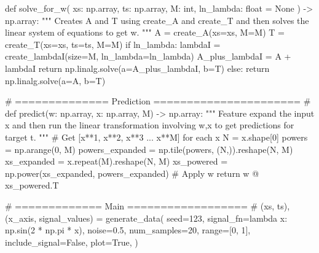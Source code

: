 \documentclass[
  0.875em,
  letterpaper,
  DIV=11,
  numbers=noendperiod]{scrartcl}
\newenvironment{Shaded}{\begin{snugshade}}{\end{snugshade}}
\newcommand{\BuiltInTok}[1]{\textcolor[rgb]{0.00,0.23,0.31}{#1}}
\newcommand{\CommentTok}[1]{\textcolor[rgb]{0.37,0.37,0.37}{#1}}
\newcommand{\ControlFlowTok}[1]{\textcolor[rgb]{0.00,0.23,0.31}{#1}}
\newcommand{\DecValTok}[1]{\textcolor[rgb]{0.68,0.00,0.00}{#1}}
\newcommand{\FloatTok}[1]{\textcolor[rgb]{0.68,0.00,0.00}{#1}}
\newcommand{\KeywordTok}[1]{\textcolor[rgb]{0.00,0.23,0.31}{#1}}
\newcommand{\NormalTok}[1]{\textcolor[rgb]{0.00,0.23,0.31}{#1}}
\newcommand{\OperatorTok}[1]{\textcolor[rgb]{0.37,0.37,0.37}{#1}}
\newcommand{\VariableTok}[1]{\textcolor[rgb]{0.07,0.07,0.07}{#1}}
\begin{document}
\begin{Shaded}
\begin{Highlighting}[]
\KeywordTok{def}\NormalTok{ solve\_for\_w(}
\NormalTok{    xs: np.array, ts: np.array, M: }\BuiltInTok{int}\NormalTok{, ln\_lambda: }\BuiltInTok{float} \OperatorTok{=} \VariableTok{None}
\NormalTok{) }\OperatorTok{{-}\textgreater{}}\NormalTok{ np.array:}
    \CommentTok{"""}
\CommentTok{    Creates A and T using \textasciigrave{}create\_A\textasciigrave{} and \textasciigrave{}create\_T\textasciigrave{} and then solves}
\CommentTok{    the linear system of equations to get w.}
\CommentTok{    """}
\NormalTok{    A }\OperatorTok{=}\NormalTok{ create\_A(xs}\OperatorTok{=}\NormalTok{xs, M}\OperatorTok{=}\NormalTok{M)}
\NormalTok{    T }\OperatorTok{=}\NormalTok{ create\_T(xs}\OperatorTok{=}\NormalTok{xs, ts}\OperatorTok{=}\NormalTok{ts, M}\OperatorTok{=}\NormalTok{M)}
    \ControlFlowTok{if}\NormalTok{ ln\_lambda:}
\NormalTok{        lambdaI }\OperatorTok{=}\NormalTok{ create\_lambdaI(size}\OperatorTok{=}\NormalTok{M, ln\_lambda}\OperatorTok{=}\NormalTok{ln\_lambda)}
\NormalTok{        A\_plus\_lambdaI }\OperatorTok{=}\NormalTok{ A }\OperatorTok{+}\NormalTok{ lambdaI}
        \ControlFlowTok{return}\NormalTok{ np.linalg.solve(a}\OperatorTok{=}\NormalTok{A\_plus\_lambdaI, b}\OperatorTok{=}\NormalTok{T)}
    \ControlFlowTok{else}\NormalTok{:}
        \ControlFlowTok{return}\NormalTok{ np.linalg.solve(a}\OperatorTok{=}\NormalTok{A, b}\OperatorTok{=}\NormalTok{T)}

\CommentTok{\# ============== Prediction ====================== \#}
\KeywordTok{def}\NormalTok{ predict(w: np.array, x: np.array, M) }\OperatorTok{{-}\textgreater{}}\NormalTok{ np.array:}
    \CommentTok{"""}
\CommentTok{    Feature expand the input x and then run the linear}
\CommentTok{    transformation involving w,x to get predictions for target t.}
\CommentTok{    """}
    \CommentTok{\# Get [x**1, x**2, x**3 ... x**M] for each x}
\NormalTok{    N }\OperatorTok{=}\NormalTok{ x.shape[}\DecValTok{0}\NormalTok{]}
\NormalTok{    powers }\OperatorTok{=}\NormalTok{ np.arange(}\DecValTok{0}\NormalTok{, M)}
\NormalTok{    powers\_expanded }\OperatorTok{=}\NormalTok{ np.tile(powers, (N,)).reshape(N, M)}
\NormalTok{    xs\_expanded }\OperatorTok{=}\NormalTok{ x.repeat(M).reshape(N, M)}
\NormalTok{    xs\_powered }\OperatorTok{=}\NormalTok{ np.power(xs\_expanded, powers\_expanded)}
    \CommentTok{\# Apply w}
    \ControlFlowTok{return}\NormalTok{ w }\OperatorTok{@}\NormalTok{ xs\_powered.T}

\CommentTok{\# ============= Main ================== \#}
\NormalTok{(xs, ts), (x\_axis, signal\_values) }\OperatorTok{=}\NormalTok{ generate\_data(}
\NormalTok{    seed}\OperatorTok{=}\DecValTok{123}\NormalTok{,}
\NormalTok{    signal\_fn}\OperatorTok{=}\KeywordTok{lambda}\NormalTok{ x: np.sin(}\DecValTok{2} \OperatorTok{*}\NormalTok{ np.pi }\OperatorTok{*}\NormalTok{ x),}
\NormalTok{    noise}\OperatorTok{=}\FloatTok{0.5}\NormalTok{,}
\NormalTok{    num\_samples}\OperatorTok{=}\DecValTok{20}\NormalTok{,}
    \BuiltInTok{range}\OperatorTok{=}\NormalTok{[}\DecValTok{0}\NormalTok{, }\DecValTok{1}\NormalTok{],}
\NormalTok{    include\_signal}\OperatorTok{=}\VariableTok{False}\NormalTok{,}
\NormalTok{    plot}\OperatorTok{=}\VariableTok{True}\NormalTok{,}
\NormalTok{)}


\end{Highlighting}
\end{Shaded}
\end{document}
